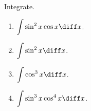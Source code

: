 Integrate.
\begin{multicols}{2}
\begin{enumerate}[ref={\fcProblemRef}]
\item $\displaystyle \int \sin^2 x \cos x\diff x$.

\item $\displaystyle \int \sin^2 x\diff x$.

\item $\displaystyle \int \cos^3 x\diff x$.

\item $\displaystyle \int \sin^3 x \cos^4 x\diff x$.

\end{enumerate}
\end{multicols}